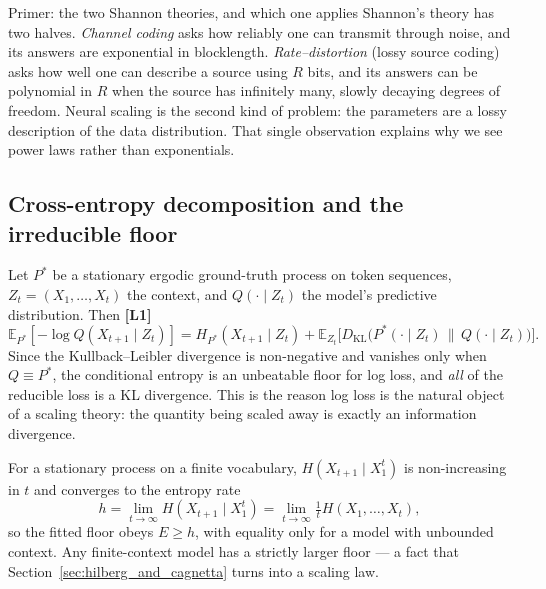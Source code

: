 \documentclass[11pt,a4paper]{article}
\theoremstyle{definition}
\begin{document}
\begin{intuition}{Primer: the two Shannon theories, and which one applies}
Shannon's theory has two halves. \emph{Channel coding} asks how reliably one can transmit through noise, and its answers are exponential in blocklength. \emph{Rate--distortion} (lossy source coding) asks how well one can describe a source using $R$ bits, and its answers can be polynomial in $R$ when the source has infinitely many, slowly decaying degrees of freedom. Neural scaling is the second kind of problem: the parameters are a lossy description of the data distribution. That single observation explains why we see power laws rather than exponentials.
\end{intuition}

\subsection{Cross-entropy decomposition and the irreducible floor}

Let $P^*$ be a stationary ergodic ground-truth process on token sequences, $Z_t = (X_1,\dots,X_t)$ the context, and $Q(\cdot\mid Z_t)$ the model's predictive distribution. Then \textbf{[L1]}
\begin{equation}
  \mathbb{E}_{P^*}[-\log Q(X_{t+1}\mid Z_t)] = H_{P^*}(X_{t+1}\mid Z_t) + \mathbb{E}_{Z_t}\big[ D_{\mathrm{KL}}\big(P^*(\cdot\mid Z_t)\,\|\,Q(\cdot\mid Z_t)\big) \big].
  \label{eq:cross-entropy}
\end{equation}
Since the Kullback--Leibler divergence is non-negative and vanishes only when $Q\equiv P^*$, the conditional entropy is an unbeatable floor for log loss, and \emph{all} of the reducible loss is a KL divergence. This is the reason log loss is the natural object of a scaling theory: the quantity being scaled away is exactly an information divergence.

For a stationary process on a finite vocabulary, $H(X_{t+1}\mid X_1^t)$ is non-increasing in $t$ and converges to the entropy rate~\cite{shannon1948mathematical,coverthomas2006elements}
\begin{equation}
  h = \lim_{t\to\infty} H(X_{t+1}\mid X_1^t) = \lim_{t\to\infty}\tfrac{1}{t}H(X_1,\dots,X_t),
\end{equation}
so the fitted floor obeys $E \ge h$, with equality only for a model with unbounded context. Any finite-context model has a strictly larger floor --- a fact that Section~\ref{sec:hilberg_and_cagnetta} turns into a scaling law.
\end{document}
